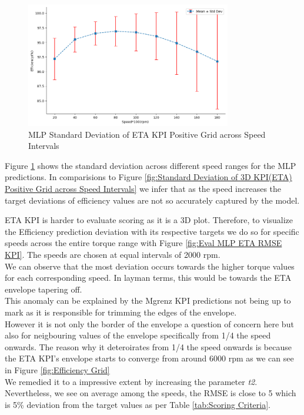 \documentclass{report} %
\begin{document}
\begin{figure}[H]
    \centering
    \includegraphics[width=0.8\textwidth]{./ReportImages/stddev_y2_nn_MLP.png} 
    \caption{\ac{MLP} Standard Deviation of ETA \ac{KPI} Positive Grid across Speed Intervals} 
    \label{fig:MLP Standard Deviation of 3D KPI(ETA) Positive Grid across Speed Intervals}
\end{figure}

Figure \ref{fig:MLP Standard Deviation of 3D KPI(ETA) Positive Grid across Speed Intervals} shows the standard deviation across different speed ranges for the \ac{MLP} predictions.
In comparisions to Figure \ref{fig:Standard Deviation of 3D KPI(ETA) Positive Grid across Speed Intervals} we infer that as the speed increases the target deviations of efficiency values are not so accurately captured by the model.

ETA \ac{KPI} is harder to evaluate scoring as it is a \ac{3D} plot. 
Therefore, to visualize the Efficiency prediction deviation with its respective targets we do so for specific speeds across the entire torque range with Figure \ref{fig:Eval MLP ETA RMSE KPI}.
The speeds are chosen at equal intervals of 2000 rpm.\\
We can observe that the most deviation occurs towards the higher torque values for each corresponding speed. In layman terms, this would be towards the ETA envelope tapering off.\\
This anomaly can be explained by the Mgrenz \ac{KPI} predictions not being up to mark as it is responsible for trimming the edges of the envelope.\\
However it is not only the border of the envelope a question of concern here but also for neigbouring values of the envelope specifically from 1/4 the speed onwards.
The reason why it deteroirates from 1/4 the speed onwards is because the ETA \ac{KPI}'s envelope starts to converge from around 6000 rpm as we can see in Figure \ref{fig:Efficiency Grid}\\
We remedied it to a impressive extent by increasing the parameter \textit{t2}.
Nevertheless, we see on average among the speeds, the \ac{RMSE} is close to 5 which is 5\% deviation from the target values as per Table \ref{tab:Scoring Criteria}.\\
\end{document}
